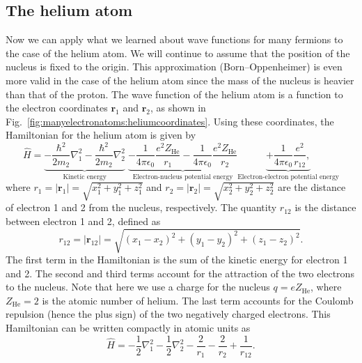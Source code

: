 \documentclass[../Main/chem331-notes.tex]{subfiles}
\begin{document}
\subsection{The helium atom}
Now we can apply what we learned about wave functions for many fermions to the case of the helium atom.
We will continue to assume that the position of the nucleus is fixed to the origin.
This approximation (Born--Oppenheimer) is even more valid in the case of the helium atom since the mass of the nucleus is heavier than that of the proton.
The wave function of the helium atom is a function to the electron coordinates $\mathbf{r}_{1}$ and $\mathbf{r}_{2}$, as shown in Fig.~\ref{fig:manyelectronatoms:heliumcoordinates}. 
Using these coordinates, the Hamiltonian for the helium atom is given by
\begin{equation}
\hat{H} = 
\underbrace{
-\frac{\hbar^2}{2 m_2} \nabla^2_1 -\frac{\hbar^2}{2 m_2} \nabla^2_2
}_{\text{Kinetic energy}}
\;
\underbrace{
- \frac{1}{4\pi\epsilon_0} \frac{e^2 Z_\mathrm{He}}{r_1} - \frac{1}{4\pi\epsilon_0} \frac{e^2 Z_\mathrm{He}}{r_2}
}_{\text{Electron-nucleus potential energy}}
\underbrace{+
\frac{1}{4\pi\epsilon_0} \frac{e^2}{r_{12}},
 }_{\text{Electron-electron potential energy}}
\end{equation}
where $r_1 = |\mathbf{r}_1| = \sqrt{x_1^2 + y_1^2 + z_1^2}$ and $r_2  = |\mathbf{r}_2|= \sqrt{x_2^2 + y_2^2 + z_2^2}$ are the distance of electron 1 and 2 from the nucleus, respectively. The quantity $r_{12}$ is the distance between electron 1 and 2, defined as
\begin{equation}
r_{12}  = |\mathbf{r}_{12}| = \sqrt{(x_1 - x_2)^2 + (y_1 - y_2)^2 + (z_1 - z_2)^2}.
\end{equation}
The first term in the Hamiltonian is the sum of the kinetic energy for electron 1 and 2.
The second and third terms account for the attraction of the two electrons to the nucleus. Note that here we use a charge for the nucleus $q = e Z_\mathrm{He}$, where $Z_\mathrm{He} = 2$ is the atomic number of helium.
The last term accounts for the Coulomb repulsion (hence the plus sign) of the two negatively charged electrons.
This Hamiltonian can be written compactly in atomic units as
\begin{equation}
\hat{H} = -\frac{1}{2} \nabla^2_1 -\frac{1}{2} \nabla^2_2 - \frac{2}{r_1} - \frac{2}{r_2} + \frac{1}{r_{12}}.
\end{equation}
\end{document}
